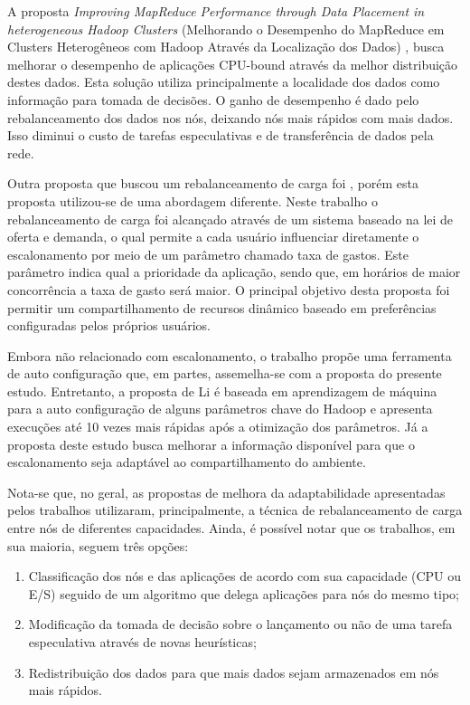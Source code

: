 A proposta \textit{Improving MapReduce Performance through Data Placement in heterogeneous Hadoop Clusters} (Melhorando o Desempenho do MapReduce em Clusters Heterogêneos com Hadoop Através da Localização dos Dados) \citet{IMRPDPHHC}, busca melhorar o desempenho de aplicações CPU-bound através da melhor distribuição destes dados. Esta solução utiliza principalmente a localidade dos dados como informação para tomada de decisões. O ganho de desempenho é dado pelo rebalanceamento dos dados nos nós, deixando nós mais rápidos com mais dados. Isso diminui o custo de tarefas especulativas e de transferência de dados pela rede.

Outra proposta que buscou um rebalanceamento de carga foi \citet{Sandholm2009}, porém esta proposta utilizou-se de uma abordagem diferente. Neste trabalho o rebalanceamento de carga foi alcançado através de um sistema baseado na lei de oferta e demanda, o qual permite a cada usuário influenciar diretamente o escalonamento por meio de um parâmetro chamado taxa de gastos. Este parâmetro indica qual a prioridade da aplicação, sendo que, em horários de maior concorrência a taxa de gasto será maior. O principal objetivo desta proposta foi permitir um compartilhamento de recursos dinâmico baseado em preferências configuradas pelos próprios usuários.

Embora não relacionado com escalonamento, o trabalho \citet{Li} propõe uma ferramenta de auto configuração que, em partes, assemelha-se com a proposta do presente estudo. Entretanto, a proposta de Li é baseada em aprendizagem de máquina para a auto configuração de alguns parâmetros chave do Hadoop e apresenta execuções até 10 vezes mais rápidas após a otimização dos parâmetros. Já a proposta deste estudo busca melhorar a informação disponível para que o escalonamento seja adaptável ao compartilhamento do ambiente.

Nota-se que, no geral, as propostas de melhora da adaptabilidade apresentadas pelos trabalhos utilizaram, principalmente, a técnica de rebalanceamento de carga entre nós de diferentes capacidades. Ainda, é possível notar que os trabalhos, em sua maioria, seguem três opções:

\begin{enumerate}
	\item Classificação dos nós e das aplicações de acordo com sua capacidade (CPU ou E/S) seguido de um algoritmo que delega aplicações para nós do mesmo tipo;
	\item Modificação da tomada de decisão sobre o lançamento ou não de uma tarefa especulativa através de novas heurísticas;
	\item Redistribuição dos dados para que mais dados sejam armazenados em nós mais rápidos.
\end{enumerate}

